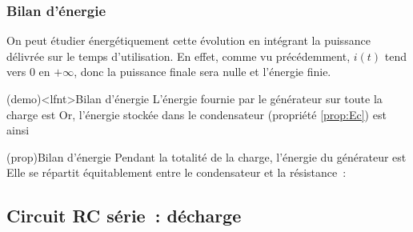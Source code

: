 \documentclass[../../main/main.tex]{subfiles}
\begin{document}
\subsubsection{Bilan d'énergie}
On peut étudier énergétiquement cette évolution en intégrant la puissance
délivrée sur le temps d'utilisation. En effet, comme vu précédemment, $i(t)$
tend vers $0$ en $+\infty$, donc la puissance finale sera nulle et l'énergie
finie.
\begin{tcb}[label=demo:rcenerg-charge](demo)<lfnt>{Bilan d'énergie}
	L'énergie fournie par le générateur sur toute la charge est
	Or, l'énergie stockée dans le condensateur (propriété \ref{prop:Ec}) est
	\psw{
		\[
			\Ec_C = \frac{1}{2}CE^2
		\]
	}
	ainsi
	\psw{
		\[
			\Ec_J = \frac{1}{2}CE^2
		\]
	}
	\vspace{-15pt}
\end{tcb}
\begin{tcb}[label=prop:rcenerg-charge](prop){Bilan d'énergie}
	Pendant la totalité de la charge, l'énergie du générateur est
	\psw{
		\[\boxed{\Ec_G = CE^2}\]
	}
	Elle se répartit équitablement entre le condensateur et la résistance~:
	\psw{
		\[\boxed{\Ec_C = \frac{1}{2} CE^2 = \Ec_J}\]
	}
	\vspace{-15pt}
\end{tcb}

\subsection{Circuit RC série~: décharge}
\end{document}
